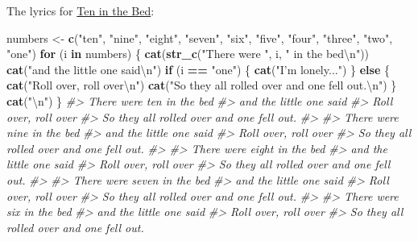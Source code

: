 \documentclass[]{book}
\newenvironment{Shaded}{\begin{snugshade}}{\end{snugshade}}
\newcommand{\CharTok}[1]{\textcolor[rgb]{0.31,0.60,0.02}{#1}}
\newcommand{\CommentTok}[1]{\textcolor[rgb]{0.56,0.35,0.01}{\textit{#1}}}
\newcommand{\ControlFlowTok}[1]{\textcolor[rgb]{0.13,0.29,0.53}{\textbf{#1}}}
\newcommand{\KeywordTok}[1]{\textcolor[rgb]{0.13,0.29,0.53}{\textbf{#1}}}
\newcommand{\NormalTok}[1]{#1}
\newcommand{\OperatorTok}[1]{\textcolor[rgb]{0.81,0.36,0.00}{\textbf{#1}}}
\newcommand{\StringTok}[1]{\textcolor[rgb]{0.31,0.60,0.02}{#1}}
\theoremstyle{plain}
\theoremstyle{remark}
\theoremstyle{definition}
\theoremstyle{definition}
\theoremstyle{definition}
\theoremstyle{remark}
\begin{document}
The lyrics for
\href{http://supersimplelearning.com/songs/original-series/one/ten-in-the-bed/}{Ten
in the Bed}:

\begin{Shaded}
\begin{Highlighting}[]
\NormalTok{numbers <-}\StringTok{ }\KeywordTok{c}\NormalTok{(}\StringTok{"ten"}\NormalTok{, }\StringTok{"nine"}\NormalTok{, }\StringTok{"eight"}\NormalTok{, }\StringTok{"seven"}\NormalTok{, }\StringTok{"six"}\NormalTok{, }\StringTok{"five"}\NormalTok{,}
             \StringTok{"four"}\NormalTok{, }\StringTok{"three"}\NormalTok{, }\StringTok{"two"}\NormalTok{, }\StringTok{"one"}\NormalTok{)}
\ControlFlowTok{for}\NormalTok{ (i }\ControlFlowTok{in}\NormalTok{ numbers) \{}
  \KeywordTok{cat}\NormalTok{(}\KeywordTok{str_c}\NormalTok{(}\StringTok{"There were "}\NormalTok{, i, }\StringTok{" in the bed}\CharTok{\textbackslash{}n}\StringTok{"}\NormalTok{))}
  \KeywordTok{cat}\NormalTok{(}\StringTok{"and the little one said}\CharTok{\textbackslash{}n}\StringTok{"}\NormalTok{)}
  \ControlFlowTok{if}\NormalTok{ (i }\OperatorTok{==}\StringTok{ "one"}\NormalTok{) \{}
    \KeywordTok{cat}\NormalTok{(}\StringTok{"I'm lonely..."}\NormalTok{)}
\NormalTok{  \} }\ControlFlowTok{else}\NormalTok{ \{}
    \KeywordTok{cat}\NormalTok{(}\StringTok{"Roll over, roll over}\CharTok{\textbackslash{}n}\StringTok{"}\NormalTok{)}
    \KeywordTok{cat}\NormalTok{(}\StringTok{"So they all rolled over and one fell out.}\CharTok{\textbackslash{}n}\StringTok{"}\NormalTok{)}
\NormalTok{  \}}
  \KeywordTok{cat}\NormalTok{(}\StringTok{"}\CharTok{\textbackslash{}n}\StringTok{"}\NormalTok{)}
\NormalTok{\}}
\CommentTok{#> There were ten in the bed}
\CommentTok{#> and the little one said}
\CommentTok{#> Roll over, roll over}
\CommentTok{#> So they all rolled over and one fell out.}
\CommentTok{#> }
\CommentTok{#> There were nine in the bed}
\CommentTok{#> and the little one said}
\CommentTok{#> Roll over, roll over}
\CommentTok{#> So they all rolled over and one fell out.}
\CommentTok{#> }
\CommentTok{#> There were eight in the bed}
\CommentTok{#> and the little one said}
\CommentTok{#> Roll over, roll over}
\CommentTok{#> So they all rolled over and one fell out.}
\CommentTok{#> }
\CommentTok{#> There were seven in the bed}
\CommentTok{#> and the little one said}
\CommentTok{#> Roll over, roll over}
\CommentTok{#> So they all rolled over and one fell out.}
\CommentTok{#> }
\CommentTok{#> There were six in the bed}
\CommentTok{#> and the little one said}
\CommentTok{#> Roll over, roll over}
\CommentTok{#> So they all rolled over and one fell out.}

\end{Highlighting}
\end{Shaded}
\end{document}
